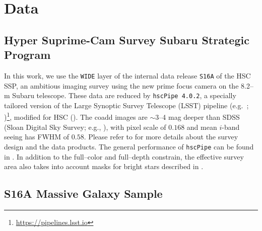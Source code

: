 \documentclass[a4paper,fleqn,usenatbib]{mnras}
\begin{document}
\section{Data}
    \label{sec:data}


\subsection{Hyper Suprime-Cam Survey Subaru Strategic Program}
    \label{sec:hsc}



	In this work, we use the \texttt{WIDE} layer of the internal data release
	\texttt{S16A} of the HSC SSP, an ambitious imaging survey using the new prime focus
	camera on the 8.2--m Subaru telescope.
	These data are reduced by \texttt{hscPipe 4.0.2}, a specially tailored version of
	the Large Synoptic Survey Telescope (LSST) pipeline (e.g.\ \citealt{Juric2015};
	\citealt{Axelrod2010})\footnote{\url{https://pipelines.lsst.io}},
	modified for HSC (\citealt{HSC-PIPE}).
	The coadd images are $\sim$3--4 mag deeper than SDSS (Sloan Digital Sky Survey;
	e.g., \citealt{SDSS-DR7, SDSS-DR8, SDSS-DR12}), with pixel scale of 0\asec{}$.168$
	and mean $i$-band seeing has FWHM of 0\asec{}$.58$.
	Please refer to \citet{HSC-SSP, HSC-DR1} for more details about the survey design
	and the data products.
	The general performance of \texttt{hscPipe} can be found in \citet{SynPipe}.
	In addition to the full--color and full--depth constrain, the effective survey
	area also takes into account masks for bright stars described in
	\citet{HSC-STAR}.


\subsection{S16A Massive Galaxy Sample}
    \label{sec:sample}
\end{document}
